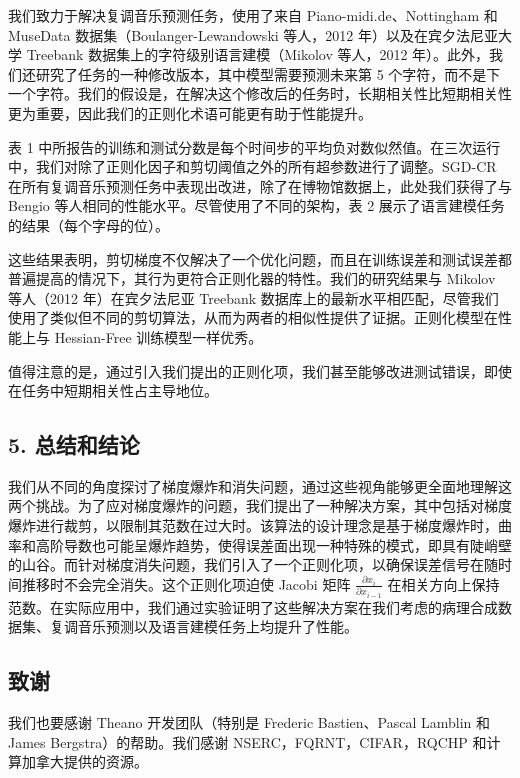 我们致力于解决复调音乐预测任务，使用了来自 Piano-midi.de、Nottingham 和 MuseData 数据集（Boulanger-Lewandowski 等人，2012 年）以及在宾夕法尼亚大学 Treebank 数据集上的字符级别语言建模（Mikolov 等人，2012 年）。此外，我们还研究了任务的一种修改版本，其中模型需要预测未来第 5 个字符，而不是下一个字符。我们的假设是，在解决这个修改后的任务时，长期相关性比短期相关性更为重要，因此我们的正则化术语可能更有助于性能提升。

表 1 中所报告的训练和测试分数是每个时间步的平均负对数似然值。在三次运行中，我们对除了正则化因子和剪切阈值之外的所有超参数进行了调整。SGD-CR 在所有复调音乐预测任务中表现出改进，除了在博物馆数据上，此处我们获得了与 Bengio 等人相同的性能水平。尽管使用了不同的架构，表 2 展示了语言建模任务的结果（每个字母的位）。

这些结果表明，剪切梯度不仅解决了一个优化问题，而且在训练误差和测试误差都普遍提高的情况下，其行为更符合正则化器的特性。我们的研究结果与 Mikolov 等人（2012 年）在宾夕法尼亚 Treebank 数据库上的最新水平相匹配，尽管我们使用了类似但不同的剪切算法，从而为两者的相似性提供了证据。正则化模型在性能上与 Hessian-Free 训练模型一样优秀。

值得注意的是，通过引入我们提出的正则化项，我们甚至能够改进测试错误，即使在任务中短期相关性占主导地位。

\subsection{5. 总结和结论}\label{5-ux603bux7ed3ux548cux7ed3ux8bba}

我们从不同的角度探讨了梯度爆炸和消失问题，通过这些视角能够更全面地理解这两个挑战。为了应对梯度爆炸的问题，我们提出了一种解决方案，其中包括对梯度爆炸进行裁剪，以限制其范数在过大时。该算法的设计理念是基于梯度爆炸时，曲率和高阶导数也可能呈爆炸趋势，使得误差面出现一种特殊的模式，即具有陡峭壁的山谷。而针对梯度消失问题，我们引入了一个正则化项，以确保误差信号在随时间推移时不会完全消失。这个正则化项迫使 Jacobi 矩阵 \(\frac{\partial x_i}{\partial x_{i-1}}\) 在相关方向上保持范数。在实际应用中，我们通过实验证明了这些解决方案在我们考虑的病理合成数据集、复调音乐预测以及语言建模任务上均提升了性能。

\subsection{致谢}\label{ux81f4ux8c22}

我们也要感谢 Theano 开发团队（特别是 Frederic Bastien、Pascal Lamblin 和 James Bergstra）的帮助。我们感谢 NSERC，FQRNT，CIFAR，RQCHP 和计算加拿大提供的资源。

